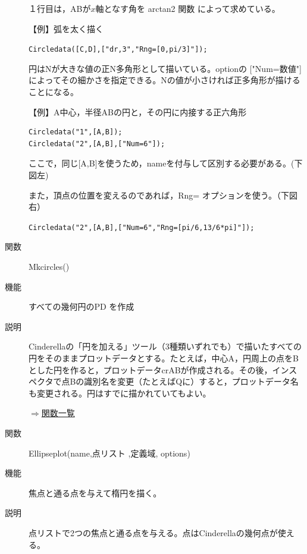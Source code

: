 \documentclass[papersize,a4paper,10pt,uplatex]{jsarticle}
\begin{document}
\begin{description}
１行目は，ABが$x$軸となす角を arctan2 関数 によって求めている。

\vspace{\baselineskip}
【例】弧を太く描く

\verb|Circledata([C,D],["dr,3","Rng=[0,pi/3]"]);|

円はNが大きな値の正N多角形として描いている。optionの ["Num=数値"] によってその細かさを指定できる。Nの値が小さければ正多角形が描けることになる。

\vspace{\baselineskip}
【例】A中心，半径ABの円と，その円に内接する正六角形
\begin{verbatim}
Circledata("1",[A,B]);
Circledata("2",[A,B],["Num=6"]);
\end{verbatim}
ここで，同じ[A,B]を使うため，nameを付与して区別する必要がある。(下図左)

また，頂点の位置を変えるのであれば，Rng= オプションを使う。（下図右）

 \verb|Circledata("2",[A,B],["Num=6","Rng=[pi/6,13/6*pi]"]);|

\hspace{10mm} 
\hspace{5mm}


\vspace{\baselineskip}
\hypertarget{mkcircles}{}
\item[関数]Mkcircles()
\item[機能]すべての幾何円のPD を作成
\item[説明]Cinderellaの「円を加える」ツール（3種類いずれでも）で描いたすべての円をそのままプロットデータとする。たとえば，中心A，円周上の点をBとした円を作ると，プロットデータcrABが作成される。その後，インスペクタで点Bの識別名を変更（たとえばQに）すると，プロットデータ名も変更される。円はすでに描かれていてもよい。

\begin{flushright}\hyperlink{functionlist}{$\Rightarrow$関数一覧}\end{flushright}

\vspace{\baselineskip}
\hypertarget{ellipseplot}{}
\item[関数]Ellipseplot(name,点リスト ,定義域, options)
\item[機能]焦点と通る点を与えて楕円を描く。
\item[説明]点リストで2つの焦点と通る点を与える。点はCinderellaの幾何点が使える。


\end{description}
\end{document}
